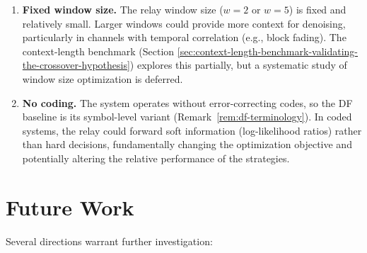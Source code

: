 \begin{enumerate}
\item
  \textbf{Fixed window size.} The relay window size (\(w = 2\) or \(w = 5\)) is fixed and relatively small. Larger windows could provide more context for denoising, particularly in channels with temporal correlation (e.g., block fading). The context-length benchmark (Section \ref{sec:context-length-benchmark-validating-the-crossover-hypothesis}) explores this partially, but a systematic study of window size optimization is deferred.
\item
  \textbf{No coding.} The system operates without error-correcting codes, so the DF baseline is its symbol-level variant (Remark~\ref{rem:df-terminology}). In coded systems, the relay could forward soft information (log-likelihood ratios) rather than hard decisions, fundamentally changing the optimization objective and potentially altering the relative performance of the strategies.
\end{enumerate}

\section{Future Work}\label{sec:future-work}

Several directions warrant further investigation:

